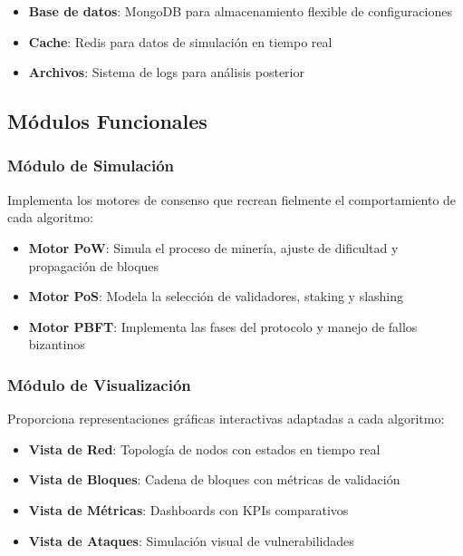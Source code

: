 \begin{itemize}
    \item \textbf{Base de datos}: MongoDB para almacenamiento flexible de configuraciones
    \item \textbf{Cache}: Redis para datos de simulación en tiempo real
    \item \textbf{Archivos}: Sistema de logs para análisis posterior
\end{itemize}

\subsection{Módulos Funcionales}

\subsubsection{Módulo de Simulación}

Implementa los motores de consenso que recrean fielmente el comportamiento de cada algoritmo:

\begin{itemize}
    \item \textbf{Motor PoW}: Simula el proceso de minería, ajuste de dificultad y propagación de bloques
    \item \textbf{Motor PoS}: Modela la selección de validadores, staking y slashing
    \item \textbf{Motor PBFT}: Implementa las fases del protocolo y manejo de fallos bizantinos
\end{itemize}

\subsubsection{Módulo de Visualización}

Proporciona representaciones gráficas interactivas adaptadas a cada algoritmo:

\begin{itemize}
    \item \textbf{Vista de Red}: Topología de nodos con estados en tiempo real
    \item \textbf{Vista de Bloques}: Cadena de bloques con métricas de validación
    \item \textbf{Vista de Métricas}: Dashboards con KPIs comparativos
    \item \textbf{Vista de Ataques}: Simulación visual de vulnerabilidades
\end{itemize}

